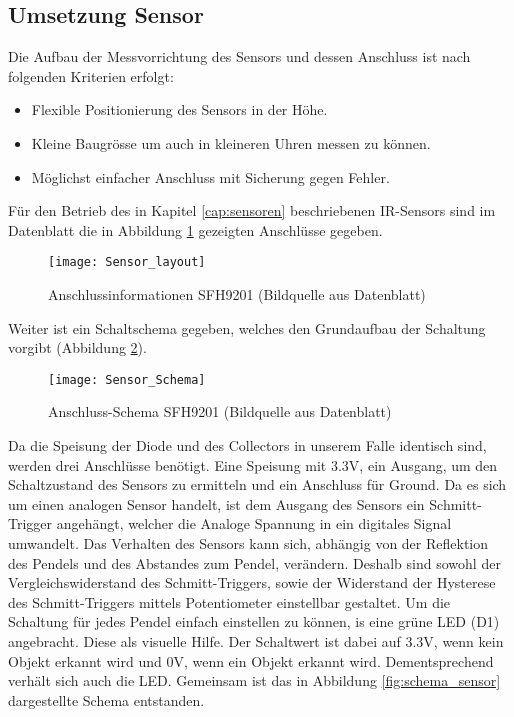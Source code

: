 \subsection{Umsetzung Sensor}
\label{cap:umsetzung_sensor}
	Die Aufbau der Messvorrichtung des Sensors und dessen Anschluss ist nach folgenden Kriterien erfolgt:
	\begin{itemize}
		\item Flexible Positionierung des Sensors in der Höhe.
		\item Kleine Baugrösse um auch in kleineren Uhren messen zu können.
		\item Möglichst einfacher Anschluss mit Sicherung gegen Fehler.
	\end{itemize}
	Für den Betrieb des in Kapitel \ref{cap:sensoren} beschriebenen IR-Sensors sind im Datenblatt die in Abbildung \ref{fig:info_SFH9201} gezeigten Anschlüsse gegeben.
	\begin{figure}[H]
		\centering
		\texttt{[image: Sensor\_layout]}
		\caption{Anschlussinformationen SFH9201 (Bildquelle aus Datenblatt)}
		\label{fig:info_SFH9201}
	\end{figure}
	Weiter ist ein Schaltschema gegeben, welches den Grundaufbau der Schaltung vorgibt (Abbildung \ref{fig:schema_SFH9201}).
	\begin{figure}[H]
		\centering
		\texttt{[image: Sensor\_Schema]}
		\caption{Anschluss-Schema SFH9201 (Bildquelle aus Datenblatt)}
		\label{fig:schema_SFH9201}
	\end{figure}
	\noindent Da die Speisung der Diode und des Collectors in unserem Falle identisch sind, werden drei Anschlüsse benötigt. Eine Speisung mit 3.3V, ein Ausgang, um den Schaltzustand des Sensors zu ermitteln und ein Anschluss für Ground. 
Da es sich um einen analogen Sensor handelt, ist dem Ausgang des Sensors ein Schmitt-Trigger angehängt, welcher die Analoge Spannung in ein digitales Signal umwandelt. 
Das Verhalten des Sensors kann sich, abhängig von der Reflektion des Pendels und des Abstandes zum Pendel, verändern. Deshalb sind sowohl der Vergleichswiderstand des Schmitt-Triggers, sowie der Widerstand der Hysterese des Schmitt-Triggers mittels Potentiometer einstellbar gestaltet. 
Um die Schaltung für jedes Pendel einfach einstellen zu können, is eine grüne LED (D1) angebracht. Diese als visuelle Hilfe. Der Schaltwert ist dabei auf 3.3V, wenn kein Objekt erkannt wird und 0V, wenn ein Objekt erkannt wird. Dementsprechend verhält sich auch die LED. Gemeinsam ist das in Abbildung \ref{fig:schema_sensor} dargestellte Schema entstanden.
